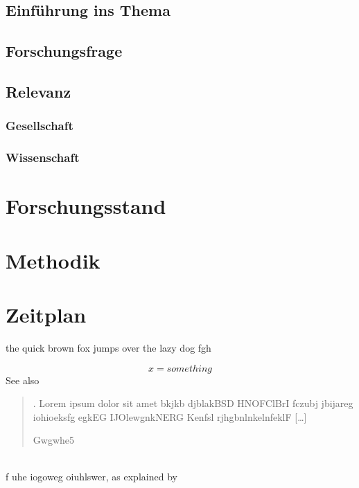 \documentclass[12pt,a4paper]{article}        %
\begin{document}
    \subsection{Einführung ins Thema}
    \subsection{Forschungsfrage}
    \subsection{Relevanz}
    \subsubsection{Gesellschaft}
    \subsubsection{Wissenschaft}
    \section{Forschungsstand}
    \section{Methodik}
    \pagebreak
    \section{Zeitplan}

    the quick brown fox jumps over the lazy dog
    fgh\smartcite[1-500, 28]{eg34} %
    
    \[x=something\]
    See also \cite{eg34}
    \blockquote[Gwgwhe5]{. Lorem ipsum dolor sit amet  bkjkb djblakBSD HNOFClBrI fczubj jbijareg iohioeksfg egkEG IJOlewgnkNERG Kenfsl rjhgbnlnkelnfeklF […]} \parencite[22]{eg34}\\ %
    f uhe iogoweg oiuhlswer, as explained by \textcite{eg34}


\pagebreak

\printbibliography[heading=bibintoc, title={References}]  %
\end{document}
